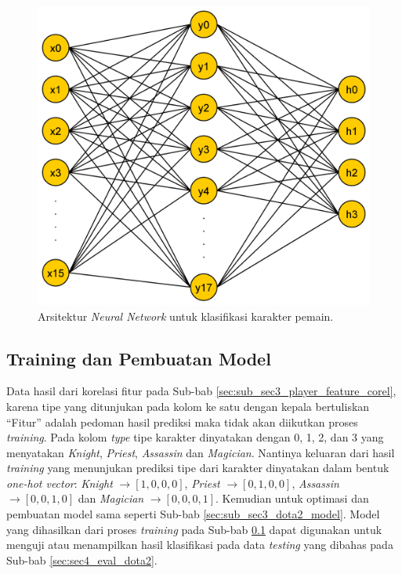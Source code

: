 \begin{figure} [!h] \centering
	\includegraphics[scale=0.08]{img/nn_player_character.png}
	\caption{Arsitektur \textit{Neural Network} untuk klasifikasi karakter pemain.}
	\label{fig:nn_player}
\end{figure}

\subsection{Training dan Pembuatan Model}
\label{sec:sub_sec3_player_char_train}
\vspace{1ex}

Data hasil dari korelasi fitur pada Sub-bab \ref{sec:sub_sec3_player_feature_corel}, karena tipe yang ditunjukan pada kolom ke satu dengan kepala bertuliskan ``Fitur'' adalah pedoman hasil prediksi maka tidak akan diikutkan proses \textit{training}. Pada kolom \textit{type} tipe karakter dinyatakan dengan 0, 1, 2, dan 3 yang menyatakan \textit{Knight}, \textit{Priest}, \textit{Assassin} dan \textit{Magician}. Nantinya keluaran dari hasil \textit{training} yang menunjukan prediksi tipe dari karakter dinyatakan dalam bentuk \textit{one-hot vector}: \textit{Knight} $\rightarrow [1, 0, 0, 0]$, \textit{Priest} $\rightarrow [0, 1, 0, 0]$, \textit{Assassin} $\rightarrow [0, 0, 1, 0]$ dan \textit{Magician} $\rightarrow [0, 0, 0, 1]$. Kemudian untuk optimasi dan pembuatan model sama seperti Sub-bab \ref{sec:sub_sec3_dota2_model}. Model yang dihasilkan dari proses \textit{training} pada Sub-bab \ref{sec:sub_sec3_player_char_train} dapat digunakan untuk menguji atau menampilkan hasil klasifikasi pada data \textit{testing} yang dibahas pada Sub-bab \ref{sec:sec4_eval_dota2}.
\vspace{1ex}

